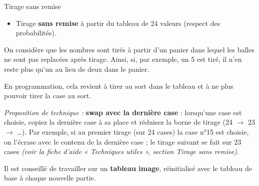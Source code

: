\begin{UPSTICahierDesCharges}{Tirage sans remise}
  \begin{itemize}
    \item Tirage \textbf{sans remise} à partir du tableau de 24 valeurs (respect des probabilités).
  \end{itemize}
On considère que les nombres sont tirés à partir d'un panier dans lequel les balles ne sont pas replacées après tirage. Ainsi, si, par exemple, un 5 est tiré, il n'en reste plus qu'un au lieu de deux dans le panier. 

En programmation, cela revient à tirer au sort dans le tableau et à ne plus pouvoir tirer la case au sort. 

\textit{Proposition de technique :} \og \textbf{swap avec la dernière case}\fg{} : lorsqu'une case est choisie, copiez la dernière case à sa place et réduisez la borne de tirage (24 $\rightarrow$ 23 $\rightarrow$ …). Par exemple, si au premier tirage (sur 24 cases) la case n°15 est choisie, on l'écrase avec le contenu de la dernière case ; le tirage suivant se fait sur 23 cases \textit{(voir la fiche d'aide « Techniques utiles », section Tirage sans remise)}.

Il est conseillé de travailler sur un \textbf{tableau image}, réinitialisé avec le tableau de base à chaque nouvelle partie.
\end{UPSTICahierDesCharges}

